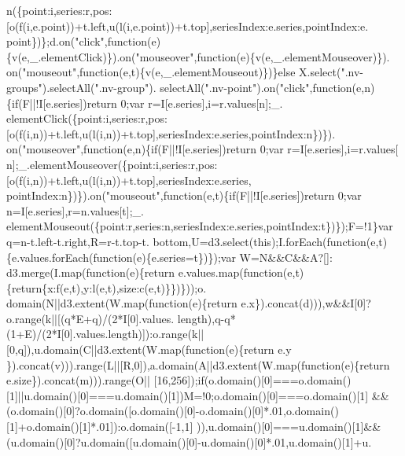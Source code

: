 \begin{DoxyCode}
      n(\{point:i,series:r,pos:[o(f(i,e.point))+t.left,u(l(i,e.point))+t.top],seriesIndex:e.series,pointIndex:e.
      point\})\};d.on(\textcolor{stringliteral}{"click"},\textcolor{keyword}{function}(e)\{v(e,\_.elementClick)\}).on(\textcolor{stringliteral}{"mouseover"},\textcolor{keyword}{function}(e)\{v(e,\_.elementMouseover)\}).
      on(\textcolor{stringliteral}{"mouseout"},\textcolor{keyword}{function}(e,t)\{v(e,\_.elementMouseout)\})\}\textcolor{keywordflow}{else} X.select(\textcolor{stringliteral}{".nv-groups"}).selectAll(\textcolor{stringliteral}{".nv-group"}).
      selectAll(\textcolor{stringliteral}{".nv-point"}).on(\textcolor{stringliteral}{"click"},\textcolor{keyword}{function}(e,n)\{\textcolor{keywordflow}{if}(F||!I[e.series])\textcolor{keywordflow}{return} 0;var r=I[e.series],i=r.values[n];\_.
      elementClick(\{point:i,series:r,pos:[o(f(i,n))+t.left,u(l(i,n))+t.top],seriesIndex:e.series,pointIndex:n\})\}).
      on(\textcolor{stringliteral}{"mouseover"},\textcolor{keyword}{function}(e,n)\{\textcolor{keywordflow}{if}(F||!I[e.series])\textcolor{keywordflow}{return} 0;var r=I[e.series],i=r.values[
      n];\_.elementMouseover(\{point:i,series:r,pos:[o(f(i,n))+t.left,u(l(i,n))+t.top],seriesIndex:e.series,
      pointIndex:n\})\}).on(\textcolor{stringliteral}{"mouseout"},\textcolor{keyword}{function}(e,t)\{\textcolor{keywordflow}{if}(F||!I[e.series])\textcolor{keywordflow}{return} 0;var n=I[e.series],r=n.values[t];\_.
      elementMouseout(\{point:r,series:n,seriesIndex:e.series,pointIndex:t\})\});F=!1\}var q=n-t.left-t.right,R=r-t.top-t.
      bottom,U=d3.select(\textcolor{keyword}{this});I.forEach(\textcolor{keyword}{function}(e,t)\{e.values.forEach(\textcolor{keyword}{function}(e)\{e.series=t\})\});var W=N&&C&&A?[]:
      d3.merge(I.map(\textcolor{keyword}{function}(e)\{return e.values.map(function(e,t)\{return\{x:f(e,t),y:l(e,t),size:c(e,t)\}\})\}));o.
      domain(N||d3.extent(W.map(\textcolor{keyword}{function}(e)\{return e.x\}).concat(d))),w&&I[0]?o.range(k||[(q*E+q)/(2*I[0].values.
      length),q-q*(1+E)/(2*I[0].values.length)]):o.range(k||[0,q]),u.domain(C||d3.extent(W.map(\textcolor{keyword}{function}(e)\{return e.y
      \}).concat(v))).range(L||[R,0]),a.domain(A||d3.extent(W.map(\textcolor{keyword}{function}(e)\{return e.size\}).concat(m))).range(O||
      [16,256]);\textcolor{keywordflow}{if}(o.domain()[0]===o.domain()[1]||u.domain()[0]===u.domain()[1])M=!0;o.domain()[0]===o.domain()[1]
      &&(o.domain()[0]?o.domain([o.domain()[0]-o.domain()[0]*.01,o.domain()[1]+o.domain()[1]*.01]):o.domain([-1,1]
      )),u.domain()[0]===u.domain()[1]&&(u.domain()[0]?u.domain([u.domain()[0]-u.domain()[0]*.01,u.domain()[1]+u.

\end{DoxyCode}
